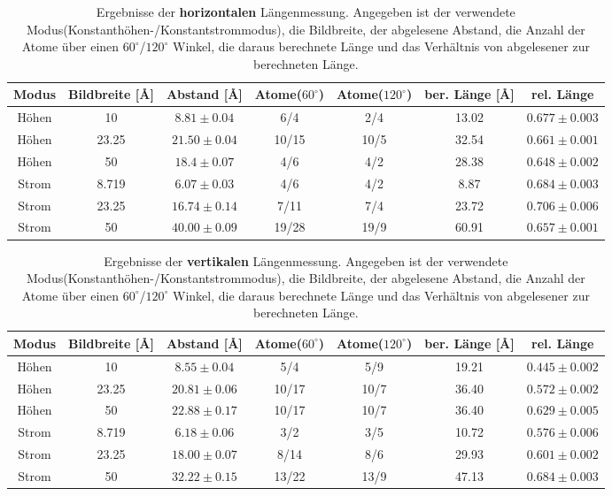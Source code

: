 \documentclass[12pt,a4paper]{article}
\begin{document}
\begin{table}
\begin{tabular}{|c|c|c||c|c||c|c|}
\hline 
Modus & Bildbreite [\si{\angstrom}] & Abstand [\si{\angstrom}] & Atome($60^{\circ}$) & Atome($120^{\circ}$) & ber. Länge [\si{\angstrom}] & rel. Länge\\ 
\hline 
\hline 
Höhen & 10 & $8.81\pm 0.04$ & 6/4 & 2/4 & 13.02& $0.677\pm 0.003$\\ 
\hline 
Höhen & 23.25 & $21.50\pm 0.04$ & 10/15 & 10/5 & 32.54& $0.661\pm 0.001$\\ 
\hline 
Höhen & 50 & $18.4\pm 0.07$ & 4/6  & 4/2 & 28.38& $0.648\pm 0.002$\\ 
\hline 
\hline
Strom & 8.719 & $6.07\pm 0.03$ & 4/6 & 4/2 & 8.87& $0.684\pm 0.003$\\ 
\hline 
Strom & 23.25 & $16.74\pm 0.14$ & 7/11  & 7/4 & 23.72& $0.706\pm 0.006$\\ 
\hline 
Strom & 50 & $40.00\pm 0.09$ & 19/28  & 19/9 & 60.91& $0.657\pm 0.001$\\ 
\hline 
\end{tabular} 
\caption{Ergebnisse der \textbf{horizontalen} Längenmessung. Angegeben ist der verwendete Modus(Konstanthöhen-/Konstantstrommodus), die Bildbreite, der abgelesene Abstand, die Anzahl der Atome über einen $60^{\circ}$/$120^{\circ}$ Winkel, die daraus berechnete Länge und das Verhältnis von abgelesener zur berechneten Länge.}
\label{tab:Atome_horizontal}
\end{table}

\begin{table}
\begin{tabular}{|c|c|c||c|c||c|c|}
\hline 
Modus & Bildbreite [\si{\angstrom}]  & Abstand [\si{\angstrom}] & Atome($60^{\circ}$) & Atome($120^{\circ}$) & ber. Länge [\si{\angstrom}] & rel. Länge\\ 
\hline 
\hline 
Höhen & 10 & $8.55\pm 0.04$ & 5/4 & 5/9 & 19.21& $0.445\pm 0.002$\\ 
\hline 
Höhen & 23.25 & $20.81\pm 0.06$ & 10/17  & 10/7 & 36.40& $0.572\pm 0.002$\\ 
\hline 
Höhen & 50 & $22.88\pm 0.17$ & 10/17  & 10/7 & 36.40& $0.629\pm 0.005$\\ 
\hline 
\hline 
Strom & 8.719 & $6.18\pm 0.06$ & 3/2 & 3/5 & 10.72& $0.576\pm 0.006$\\
\hline 
Strom & 23.25 & $18.00\pm 0.07$ & 8/14  & 8/6 & 29.93& $0.601\pm 0.002$\\
\hline 
Strom & 50 & $32.22\pm 0.15$ & 13/22  & 13/9 & 47.13& $0.684\pm 0.003$\\
\hline 
\end{tabular} 
\caption{Ergebnisse der \textbf{vertikalen} Längenmessung. Angegeben ist der verwendete Modus(Konstanthöhen-/Konstantstrommodus), die Bildbreite, der abgelesene Abstand, die Anzahl der Atome über einen $60^{\circ}$/$120^{\circ}$ Winkel, die daraus berechnete Länge und das Verhältnis von abgelesener zur berechneten Länge.}
\label{tab:Atome_vertikal}
\end{table}
\end{document}
